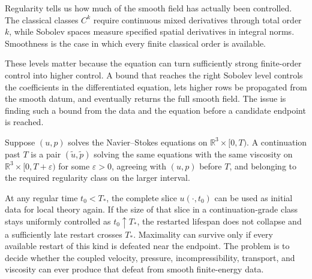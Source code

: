 \begin{definition}[Regularity]\label{def:Regularity}
Regularity tells us how much of the smooth field has actually been controlled.
The classical classes \(C^k\) require continuous mixed derivatives through total order \(k\), while Sobolev spaces measure specified spatial derivatives in integral norms.
Smoothness is the case in which every finite classical order is available.
\end{definition}

These levels matter because the equation can turn sufficiently strong finite-order control into higher control.
A bound that reaches the right Sobolev level controls the coefficients in the differentiated equation, lets higher rows be propagated from the smooth datum, and eventually returns the full smooth field.
The issue is finding such a bound from the data and the equation before a candidate endpoint is reached.


\begin{definition}[Continuation]\label{def:Continuation}
Suppose \((u,p)\) solves the Navier--Stokes equations on \(\mathbb R^3\times[0,T)\).
A continuation past \(T\) is a pair \((\widetilde u,\widetilde p)\) solving the same equations with the same viscosity on \(\mathbb R^3\times[0,T+\varepsilon)\) for some \(\varepsilon>0\), agreeing with \((u,p)\) before \(T\), and belonging to the required regularity class on the larger interval.
\end{definition}

At any regular time \(t_0<T_*\), the complete slice \(u(\cdot,t_0)\) can be used as initial data for local theory again.
If the size of that slice in a continuation-grade class stays uniformly controlled as \(t_0\uparrow T_*\), the restarted lifespan does not collapse and a sufficiently late restart crosses \(T_*\).
Maximality can survive only if every available restart of this kind is defeated near the endpoint.
The problem is to decide whether the coupled velocity, pressure, incompressibility, transport, and viscosity can ever produce that defeat from smooth finite-energy data.
